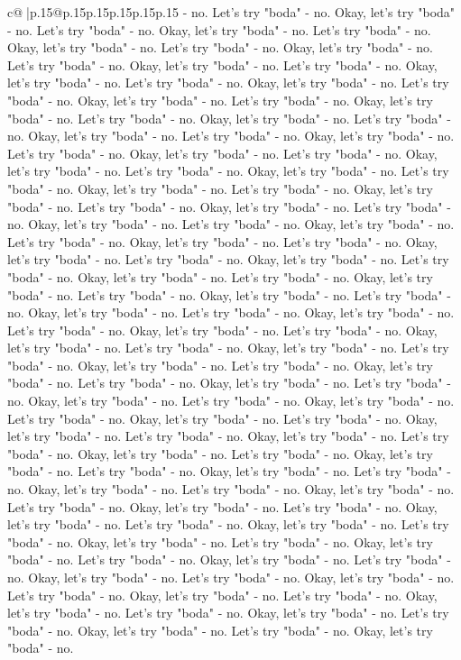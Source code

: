 \documentclass{article}
\begin{document}
{\begin{supertabular}{c@{$\;$}|p{.15\linewidth}@{}p{.15\linewidth}p{.15\linewidth}p{.15\linewidth}p{.15\linewidth}p{.15\linewidth}}
{{{{-} no. Let's try "boda" {-} no. Okay, let's try "boda" {-} no. Let's try "boda" {-} no. Okay, let's try "boda" {-} no. Let's try "boda" {-} no. Okay, let's try "boda" {-} no. Let's try "boda" {-} no. Okay, let's try "boda" {-} no. Let's try "boda" {-} no. Okay, let's try "boda" {-} no. Let's try "boda" {-} no. Okay, let's try "boda" {-} no. Let's try "boda" {-} no. Okay, let's try "boda" {-} no. Let's try "boda" {-} no. Okay, let's try "boda" {-} no. Let's try "boda" {-} no. Okay, let's try "boda" {-} no. Let's try "boda" {-} no. Okay, let's try "boda" {-} no. Let's try "boda" {-} no. Okay, let's try "boda" {-} no. Let's try "boda" {-} no. Okay, let's try "boda" {-} no. Let's try "boda" {-} no. Okay, let's try "boda" {-} no. Let's try "boda" {-} no. Okay, let's try "boda" {-} no. Let's try "boda" {-} no. Okay, let's try "boda" {-} no. Let's try "boda" {-} no. Okay, let's try "boda" {-} no. Let's try "boda" {-} no. Okay, let's try "boda" {-} no. Let's try "boda" {-} no. Okay, let's try "boda" {-} no. Let's try "boda" {-} no. Okay, let's try "boda" {-} no. Let's try "boda" {-} no. Okay, let's try "boda" {-} no. Let's try "boda" {-} no. Okay, let's try "boda" {-} no. Let's try "boda" {-} no. Okay, let's try "boda" {-} no. Let's try "boda" {-} no. Okay, let's try "boda" {-} no. Let's try "boda" {-} no. Okay, let's try "boda" {-} no. Let's try "boda" {-} no. Okay, let's try "boda" {-} no. Let's try "boda" {-} no. Okay, let's try "boda" {-} no. Let's try "boda" {-} no. Okay, let's try "boda" {-} no. Let's try "boda" {-} no. Okay, let's try "boda" {-} no. Let's try "boda" {-} no. Okay, let's try "boda" {-} no. Let's try "boda" {-} no. Okay, let's try "boda" {-} no. Let's try "boda" {-} no. Okay, let's try "boda" {-} no. Let's try "boda" {-} no. Okay, let's try "boda" {-} no. Let's try "boda" {-} no. Okay, let's try "boda" {-} no. Let's try "boda" {-} no. Okay, let's try "boda" {-} no. Let's try "boda" {-} no. Okay, let's try "boda" {-} no. Let's try "boda" {-} no. Okay, let's try "boda" {-} no. Let's try "boda" {-} no. Okay, let's try "boda" {-} no. Let's try "boda" {-} no. Okay, let's try "boda" {-} no. Let's try "boda" {-} no. Okay, let's try "boda" {-} no. Let's try "boda" {-} no. Okay, let's try "boda" {-} no. Let's try "boda" {-} no. Okay, let's try "boda" {-} no. Let's try "boda" {-} no. Okay, let's try "boda" {-} no. Let's try "boda" {-} no. Okay, let's try "boda" {-} no. Let's try "boda" {-} no. Okay, let's try "boda" {-} no. Let's try "boda" {-} no. Okay, let's try "boda" {-} no. Let's try "boda" {-} no. Okay, let's try "boda" {-} no. Let's try "boda" {-} no. Okay, let's try "boda" {-} no. Let's try "boda" {-} no. Okay, let's try "boda" {-} no. Let's try "boda" {-} no. Okay, let's try "boda" {-} no. Let's try "boda" {-} no. Okay, let's try "boda" {-} no. Let's try "boda" {-} no. Okay, let's try "boda" {-} no. Let's try "boda" {-} no. Okay, let's try "boda" {-} no. Let's try "boda" {-} no. Okay, let's try "boda" {-} no. Let's try "boda" {-} no. Okay, let's try "boda" {-} no. Let's try "boda" {-} no. Okay, let's try "boda" {-} no. Let's try "boda" {-} no. Okay, let's try "boda" {-} no. Let's try "boda" {-} no. Okay, let's try "boda" {-} no. }}}
\end{supertabular}}
\end{document}
